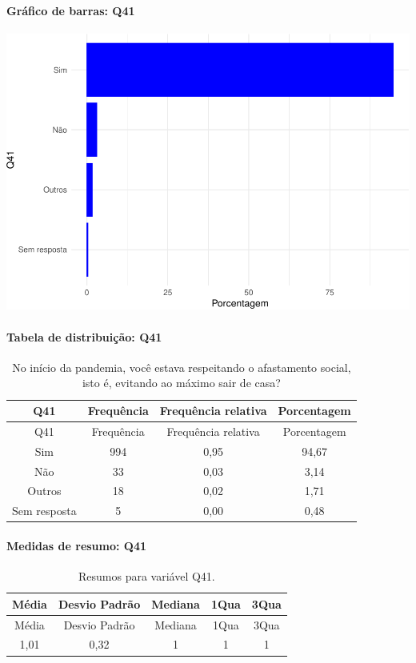 \documentclass[]{article}
\let\oldparagraph\paragraph
\renewcommand{\paragraph}[1]{\oldparagraph{#1}\mbox{}}
\begin{document}
\hypertarget{gruxe1fico-de-barras-q41}{%
\paragraph{Gráfico de barras: Q41}\label{gruxe1fico-de-barras-q41}}

\begin{center}\includegraphics[width=0.75\linewidth]{relatorio_covid19_files/figure-latex/unnamed-chunk-1603-1} \end{center}

\hypertarget{tabela-de-distribuiuxe7uxe3o-q41}{%
\paragraph{Tabela de distribuição: Q41}\label{tabela-de-distribuiuxe7uxe3o-q41}}

\begin{longtable}[]{@{}cccc@{}}
\caption{\label{tab:unnamed-chunk-1604}No início da pandemia, você estava respeitando o afastamento social, isto é, evitando ao máximo sair de casa?}\tabularnewline
\toprule
Q41 & Frequência & Frequência relativa & Porcentagem\tabularnewline
\midrule
\endfirsthead
\toprule
Q41 & Frequência & Frequência relativa & Porcentagem\tabularnewline
\midrule
\endhead
Sim & 994 & 0,95 & 94,67\tabularnewline
Não & 33 & 0,03 & 3,14\tabularnewline
Outros & 18 & 0,02 & 1,71\tabularnewline
Sem resposta & 5 & 0,00 & 0,48\tabularnewline
\bottomrule
\end{longtable}

\hypertarget{medidas-de-resumo-q41}{%
\paragraph{Medidas de resumo: Q41}\label{medidas-de-resumo-q41}}

\begin{longtable}[]{@{}ccccc@{}}
\caption{\label{tab:unnamed-chunk-1605}Resumos para variável Q41.}\tabularnewline
\toprule
Média & Desvio Padrão & Mediana & 1Qua & 3Qua\tabularnewline
\midrule
\endfirsthead
\toprule
Média & Desvio Padrão & Mediana & 1Qua & 3Qua\tabularnewline
\midrule
\endhead
1,01 & 0,32 & 1 & 1 & 1\tabularnewline
\bottomrule
\end{longtable}
\end{document}
